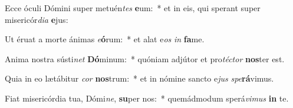 \item Ecce óculi Dómini super metuén\textit{tes} \textbf{e}um:~* et in eis, qui sperant super misericór\textit{di}\textit{a} \textbf{e}jus:
\item Ut éruat a morte ánimas \textit{e}\textbf{ó}rum:~* et alat e\textit{os} \textit{in} \textbf{fa}me.
\item Anima nostra sústi\textit{net} \textbf{Dó}minum:~* quóniam adjútor et pro\textit{téc}\textit{tor} \textbf{nos}ter est.
\item Quia in eo lætábitur \textit{cor} \textbf{nos}trum:~* et in nómine sancto e\textit{jus} \textit{spe}\textbf{rá}vimus.
\item Fiat misericórdia tua, Dómi\textit{ne}, \textbf{su}per nos:~* quemádmodum sperá\textit{vi}\textit{mus} \textbf{in} te.
